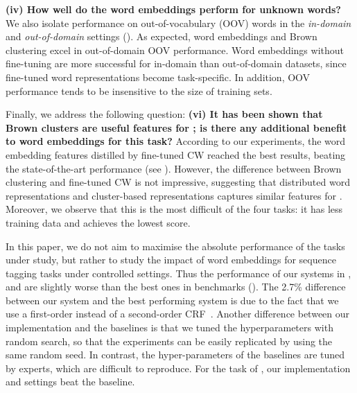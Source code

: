 \textbf{(iv) How well do the word embeddings perform for unknown words?}
We also isolate performance on out-of-vocabulary (OOV) words 
in the \textit{in-domain} and \textit{out-of-domain} settings ().
As expected, word embeddings and Brown clustering excel in out-of-domain OOV performance.
Word embeddings without\nss{[with?]} fine-tuning are more successful for 
in-domain than out-of-domain datasets, since fine-tuned
word representations become task-specific. 
In addition, OOV performance tends to be insensitive to the size of training sets.



Finally, we address the following question: \textbf{(vi) It has been shown that Brown clusters are useful features for \mwe; is there any additional benefit to word embeddings for this task?} 
According to our experiments, the word embedding features distilled by fine-tuned CW reached the best results, beating the state-of-the-art performance (see ).
However, the difference between Brown clustering and fine-tuned CW is not impressive, suggesting that distributed word representations and cluster-based representations captures similar features for \mwe. Moreover, we observe that this is the most difficult of the four tasks: it has less training data and achieves the lowest score.


In this paper, we do not aim to maximise the absolute performance of the tasks under 
study, but rather to study the impact of word embeddings for sequence tagging tasks under controlled settings. Thus the performance of our systems in \ner, \pos and \chunking are slightly worse than the best ones in benchmarks (). The 2.7\% difference between our \ner system and the best performing system is due to the fact that we use a first-order instead of a second-order CRF~\cite{Ando:2005}. 
Another difference between our implementation and the baselines is that we tuned the hyperparameters with random search, so that the experiments can be easily replicated by using the same random seed. In contrast, the hyper-parameters of the baselines are tuned by experts, which are difficult to reproduce. For the task of \mwe, our implementation and settings beat the baseline.




